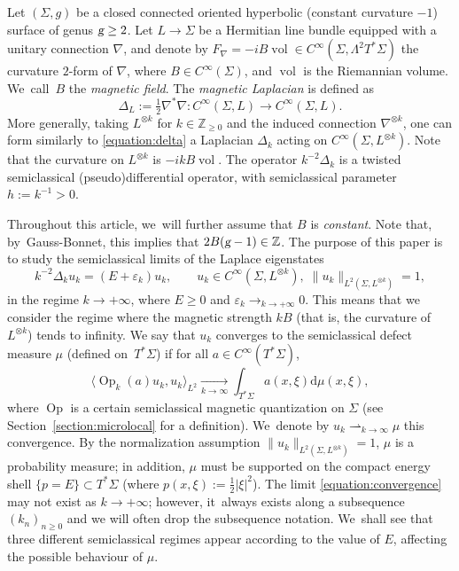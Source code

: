 \documentclass[10pt]{amsart}
\theoremstyle{plain}
\theoremstyle{definition}
\newcommand{\Z}{\mathbb{Z}}
\let\eps\varepsilon
\newcommand{\dd}{\mathrm{d}}
\DeclareMathOperator{\Op}{Op}
\DeclareMathOperator{\vol}{vol}
\begin{document}
Let $(\Sigma,g)$ be a closed connected oriented hyperbolic (constant curvature $-1$) surface of genus $\textsl{g} \geq 2$. Let $L \to \Sigma$ be a Hermitian line bundle equipped with a unitary connection $\nabla$, and denote by $F_\nabla = -i B \vol \in C^\infty(\Sigma, \Lambda^2 T^*\Sigma)$ the curvature $2$-form of $\nabla$, where $B \in C^\infty(\Sigma)$, and $\vol$ is the Riemannian volume. We~call~$B$ the \emph{magnetic field}. The \emph{magnetic Laplacian} is defined as
\begin{equation}
\label{equation:delta}
\Delta_L := \tfrac{1}{2} \nabla^* \nabla : C^\infty(\Sigma,L) \to C^\infty(\Sigma,L).
\end{equation}
More generally, taking $L^{\otimes k}$ for $k \in \Z_{\geq 0}$ and the induced connection $\nabla^{\otimes k}$, one can form similarly to \eqref{equation:delta} a Laplacian $\Delta_k$ acting on $C^\infty(\Sigma,L^{\otimes k})$. {\color{black}Note that the curvature on $L^{\otimes k}$ is $-ikB\vol$.} The operator $k^{-2}\Delta_k$ is a twisted semiclassical (pseudo)differential operator, with semiclassical parameter $h := k^{-1} > 0$.

Throughout this article, we~will further assume that $B$ is \emph{constant}. Note that, by~Gauss-Bonnet, this implies that $2B(\textsl{g}-1) \in \Z$. The purpose of this paper is to study the semiclassical limits of the Laplace eigenstates
\begin{equation}
\label{equation:eigenstates}
k^{-2}\Delta_k u_k = (E+\eps_k)u_k, \qquad u_k \in C^\infty(\Sigma,L^{\otimes
k}), \; \|u_k\|_{L^2(\Sigma,L^{\otimes k})} = 1,
\end{equation}
in the regime $k \to +\infty$, where $E \geq 0$ and $\eps_k \to_{k \to +\infty} 0$. {\color{black}This means that we consider the regime where the magnetic strength $kB$ (that is, the curvature of $L^{\otimes k}$) tends to infinity.} We say that $u_k$ converges to the semiclassical defect measure $\mu$ (defined on~$T^*\Sigma$) if for all $a \in C^\infty(T^*\Sigma)$,
\begin{equation}
\label{equation:convergence}
\langle\Op_{k}(a)u_{k},u_{k}\rangle_{L^2} \underset{k \to \infty}\to \int_{T^*\Sigma} a(x,\xi) \dd\mu(x,\xi),
\end{equation}
where $\Op$ is a certain semiclassical magnetic quantization on $\Sigma$ (see Section~\ref{section:microlocal} for a definition). We~denote by $u_k \rightharpoonup_{k \to \infty} \mu$ this convergence. By the normalization assumption $\|u_k\|_{L^2(\Sigma,L^{\otimes k})} = 1$, $\mu$ is a probability measure; in addition, $\mu$ must be supported on the compact energy shell $\{p=E\} \subset T^*\Sigma$ (where $p(x,\xi) := \tfrac{1}{2}|\xi|^2$). The limit \eqref{equation:convergence} may not exist as $k \to +\infty$; however, it~always exists along a subsequence $(k_n)_{n \geq 0}$ and we will often drop the subsequence notation. We~shall see that three different semiclassical regimes appear according to the value of $E$, affecting the possible behaviour of $\mu$.
\end{document}
